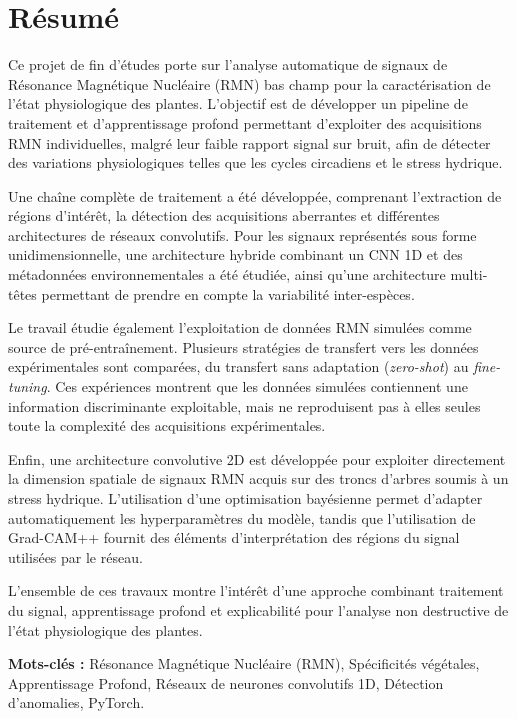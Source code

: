 \documentclass[12pt,a4paper,twoside]{article}
\begin{document}
\clearpage

\thispagestyle{plain}
\section*{Résumé}

Ce projet de fin d'études porte sur l'analyse automatique de signaux de Résonance
Magnétique Nucléaire (RMN) bas champ pour la caractérisation de l'état
physiologique des plantes. L'objectif est de développer un pipeline de traitement
et d'apprentissage profond permettant d'exploiter des acquisitions RMN
individuelles, malgré leur faible rapport signal sur bruit, afin de détecter des
variations physiologiques telles que les cycles circadiens et le stress hydrique.

Une chaîne complète de traitement a été développée, comprenant l'extraction de
régions d'intérêt, la détection des acquisitions aberrantes et différentes
architectures de réseaux convolutifs. Pour les signaux représentés sous forme
unidimensionnelle, une architecture hybride combinant un CNN 1D et des
métadonnées environnementales a été étudiée, ainsi qu'une architecture
multi-têtes permettant de prendre en compte la variabilité inter-espèces.

Le travail étudie également l'exploitation de données RMN simulées comme source
de pré-entraînement. Plusieurs stratégies de transfert vers les données
expérimentales sont comparées, du transfert sans adaptation (\textit{zero-shot})
au \textit{fine-tuning}. Ces expériences montrent que les données simulées
contiennent une information discriminante exploitable, mais ne reproduisent pas
à elles seules toute la complexité des acquisitions expérimentales.

Enfin, une architecture convolutive 2D est développée pour exploiter directement
la dimension spatiale de signaux RMN acquis sur des troncs d'arbres soumis à un
stress hydrique. L'utilisation d'une optimisation bayésienne permet d'adapter
automatiquement les hyperparamètres du modèle, tandis que l'utilisation de
Grad-CAM++ fournit des éléments d'interprétation des régions du signal utilisées
par le réseau.

L'ensemble de ces travaux montre l'intérêt d'une approche combinant traitement
du signal, apprentissage profond et explicabilité pour l'analyse non destructive
de l'état physiologique des plantes.

\vspace{1cm}
\noindent \textbf{Mots-clés :} Résonance Magnétique Nucléaire (RMN), Spécificités végétales, Apprentissage Profond, Réseaux de neurones convolutifs 1D, Détection d'anomalies, PyTorch.
\end{document}
